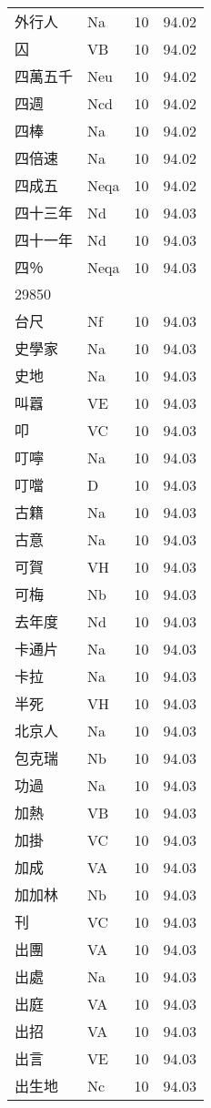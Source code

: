 \documentclass[twocolumn]{book}
\begin{document}
\begin{supertabular}{llrr}
外行人 & Na & 10 &  94.02\\
囚 & VB & 10 &  94.02\\
四萬五千 & Neu & 10 &  94.02\\
四週 & Ncd & 10 &  94.02\\
四棒 & Na & 10 &  94.02\\
四倍速 & Na & 10 &  94.02\\
四成五 & Neqa & 10 &  94.02\\
四十三年 & Nd & 10 &  94.03\\
四十一年 & Nd & 10 &  94.03\\
四％ & Neqa & 10 &  94.03\\
29850\\
台尺 & Nf & 10 &  94.03\\
史學家 & Na & 10 &  94.03\\
史地 & Na & 10 &  94.03\\
叫囂 & VE & 10 &  94.03\\
叩 & VC & 10 &  94.03\\
叮嚀 & Na & 10 &  94.03\\
叮噹 & D & 10 &  94.03\\
古籍 & Na & 10 &  94.03\\
古意 & Na & 10 &  94.03\\
可賀 & VH & 10 &  94.03\\
可梅 & Nb & 10 &  94.03\\
去年度 & Nd & 10 &  94.03\\
卡通片 & Na & 10 &  94.03\\
卡拉 & Na & 10 &  94.03\\
半死 & VH & 10 &  94.03\\
北京人 & Na & 10 &  94.03\\
包克瑞 & Nb & 10 &  94.03\\
功過 & Na & 10 &  94.03\\
加熱 & VB & 10 &  94.03\\
加掛 & VC & 10 &  94.03\\
加成 & VA & 10 &  94.03\\
加加林 & Nb & 10 &  94.03\\
刊 & VC & 10 &  94.03\\
出團 & VA & 10 &  94.03\\
出處 & Na & 10 &  94.03\\
出庭 & VA & 10 &  94.03\\
出招 & VA & 10 &  94.03\\
出言 & VE & 10 &  94.03\\
出生地 & Nc & 10 &  94.03\\

\end{supertabular}
\end{document}

